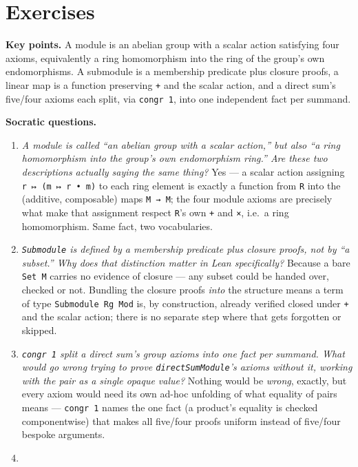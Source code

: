 \section{Exercises}\label{sec:10-modules:07-exercises:1}

\textbf{Key points.} A module is an abelian group with a scalar action satisfying four axioms, equivalently a ring homomorphism into the ring of the group's own endomorphisms. A submodule is a membership predicate plus closure proofs, a linear map is a function preserving \texttt{+} and the scalar action, and a direct sum's five/four axioms each split, via \texttt{congr 1}, into one independent fact per summand.

\textbf{Socratic questions.}

\begin{enumerate}
\def\labelenumi{\arabic{enumi}.}
\item
  \emph{A module is called ``an abelian group with a scalar action,'' but also ``a ring homomorphism into the group's own endomorphism ring.'' Are these two descriptions actually saying the same thing?} Yes --- a scalar action assigning \texttt{r ↦ (m ↦ r • m)} to each ring element is exactly a function from \texttt{R} into the (additive, composable) maps \texttt{M → M}; the four module axioms are precisely what make that assignment respect \texttt{R}'s own \texttt{+} and \texttt{×}, i.e.~a ring homomorphism. Same fact, two vocabularies.
\item
  \emph{\texttt{Submodule} is defined by a membership predicate plus closure proofs, not by ``a subset.'' Why does that distinction matter in Lean specifically?} Because a bare \texttt{Set M} carries no evidence of closure --- any subset could be handed over, checked or not. Bundling the closure proofs \emph{into} the structure means a term of type \texttt{Submodule Rg Mod} is, by construction, already verified closed under \texttt{+} and the scalar action; there is no separate step where that gets forgotten or skipped.
\item
  \emph{\texttt{congr 1} split a direct sum's group axioms into one fact per summand. What would go wrong trying to prove \texttt{directSumModule}'s axioms without it, working with the pair as a single opaque value?} Nothing would be \emph{wrong}, exactly, but every axiom would need its own ad-hoc unfolding of what equality of pairs means --- \texttt{congr 1} names the one fact (a product's equality is checked componentwise) that makes all five/four proofs uniform instead of five/four bespoke arguments.
\item

\end{enumerate}
